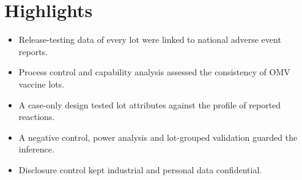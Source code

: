 \documentclass[11pt]{article}
\begin{document}
\SyntheticNotice
\section*{Highlights}
\begin{itemize}
\item Release-testing data of every lot were linked to national adverse event reports.
\item Process control and capability analysis assessed the consistency of OMV vaccine lots.
\item A case-only design tested lot attributes against the profile of reported reactions.
\item A negative control, power analysis and lot-grouped validation guarded the inference.
\item Disclosure control kept industrial and personal data confidential.
\end{itemize}
\end{document}
